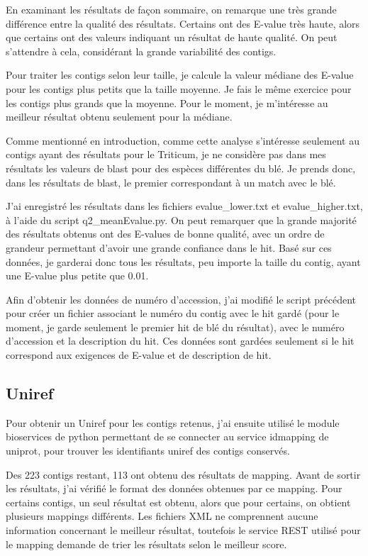\documentclass[10.9pt]{article} %
\begin{document}
En examinant les résultats de façon sommaire, on remarque une très grande différence entre la qualité des
résultats. Certains ont des E-value très haute, alors que certains ont des valeurs indiquant un résultat de
haute qualité. On peut s'attendre à cela, considérant la grande variabilité des contigs.

Pour traiter les contigs selon leur taille, je calcule la valeur médiane des E-value pour les contigs plus
petits que la taille moyenne. Je fais le même exercice pour les contigs plus grands que la moyenne. Pour
le moment, je m'intéresse au meilleur résultat obtenu seulement pour la médiane.

Comme mentionné en introduction, comme cette analyse s'intéresse seulement au contigs ayant des résultats
pour le Triticum, je ne considère pas dans mes résultats les valeurs de blast pour des espèces différentes
du blé. Je prends donc, dans les résultats de blast, le premier correspondant à un match avec le blé.

J'ai enregistré les résultats dans les fichiers evalue\_lower.txt et evalue\_higher.txt, à l'aide du script
q2\_meanEvalue.py. On peut remarquer que la grande majorité des résultats  obtenus ont des E-values de bonne
qualité, avec un ordre de grandeur permettant d'avoir une grande confiance dans le hit. Basé sur ces données,
je garderai donc tous les résultats, peu importe la taille du contig, ayant une E-value plus petite que 0.01.

Afin d'obtenir les données de numéro d'accession, j'ai modifié le script précédent pour créer un fichier associant
le numéro du contig avec le hit gardé (pour le moment, je garde seulement le premier hit de blé du résultat), avec
le numéro d'accession et la description du hit. Ces données sont gardées seulement si le hit correspond aux
exigences de E-value et de description de hit.

\subsection{Uniref}

Pour obtenir un Uniref \cite{Uniref} pour les contigs retenus, j'ai ensuite utilisé le module bioservices de python permettant
de se connecter au service idmapping de uniprot, pour trouver les identifiants uniref des contigs conservés.

Des 223 contigs restant, 113 ont obtenu des résultats de mapping. Avant de sortir les résultats, j'ai vérifié
le format des données obtenues par ce mapping. Pour certains contigs, un seul résultat est obtenu, alors que
pour certains, on obtient plusieurs mappings différents. Les fichiers XML ne comprennent aucune information
concernant le meilleur résultat, toutefois le service REST utilisé pour le mapping demande de trier les
résultats selon le meilleur score.
\end{document}
